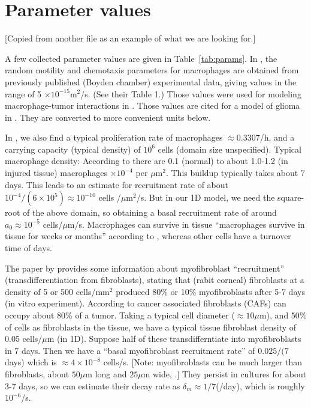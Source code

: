 \newpage 
\section*{Parameter values}
[Copied from another file as an example of what we are looking for.]

A few collected parameter values are given in Table~\ref{tab:params}. In \cite{owen1997pattern}, the random motility and chemotaxis parameters for macrophages are obtained from previously published (Boyden chamber)  experimental data, giving values in the range of 5 $\times 10^{-15}$m$^2$/s. (See their Table 1.) Those values were used for modeling macrophage-tumor interactions in \cite{owen1997pattern}. Those values are cited for a model of glioma in \cite{khajanchi2021spatiotemporal}. They are converted to more convenient units below.

In \cite{khajanchi2021spatiotemporal}, we also find a typical proliferation rate of macrophages $\approx 0.3307$/h, and a carrying capacity (typical density) of  $10^6$ cells (domain size unspecified). Typical macrophage density: According to \cite{gupta2006spatiotemporal} there are 0.1 (normal) to about 1.0-1.2 (in injured tissue)  macrophages $\times 10^{-4}$ per $\mu$m$^2$. This buildup typically takes about 7 days. This leads to an estimate for recruitment rate of about $10^{-4}/(6\times 10^5) \approx 10^{-10}$ cells /$\mu$m$^2$/s. But in our 1D model, we need the square-root of the above domain, so obtaining a basal recruitment rate of around $a_0\approx 10^{-5}$ cells/$\mu$m/s.
Macrophages can survive in tissue ``macrophages survive in tissue for weeks or months'' according to \cite{owen1997pattern}, whereas other cells have a turnover time of days.


The paper by \cite{masur1996myofibroblasts} provides some information about myofibroblast ``recruitment'' (transdifferentiation from fibroblasts), stating that (rabit corneal) fibroblasts at a density of 5 or 500 cells/mm$^2$ produced 80\% or 10\% myofibroblasts after 5-7 days (in vitro experiment). According to \cite{gascard2016carcinoma} cancer associated fibroblasts (CAFs) can occupy about 80\% of a tumor. Taking a typical cell diameter ($\approx 10\mu$m), and 50\% of cells as fibroblasts in the tissue, we have a typical tissue fibroblast density of 0.05 cells/$\mu$m (in 1D). Suppose half of these transdifferntiate into myofibroblasts in 7 days. Then we have a ``basal myofibroblast recruitment rate'' of  $0.025/(7$ days) which is $\approx 4 \times 10^{-8}$ cells/s. [Note: myofibroblasts can be much larger than fibroblasts, about $50\mu$m long and $25\mu$m wide, \cite{masur1996myofibroblasts}.] They persist in cultures for about 3-7 days, so we can estimate their decay rate as $\delta_m\approx 1/7$(/day), which is roughly $10^{-6}$/s.

